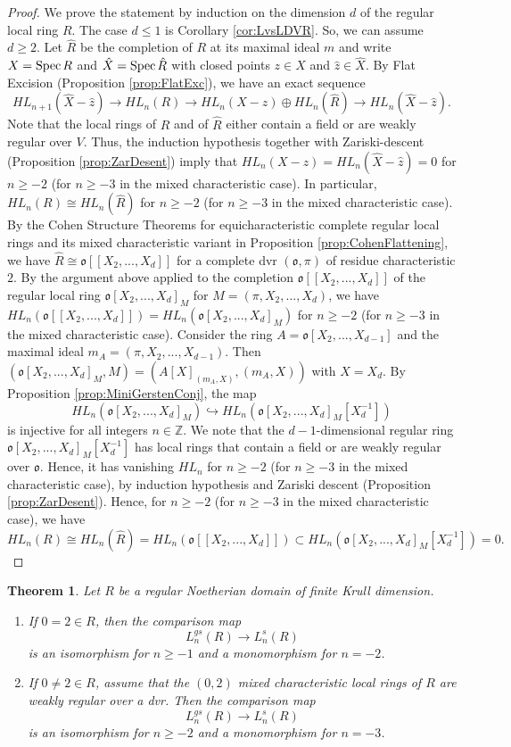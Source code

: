 \documentclass[10pt,twoside,a4paper,reqno]{amsart}
\newtheorem{theorem}{Theorem}[section]
\theoremstyle{definition}
\numberwithin{equation}{section}
\newcommand{\spec}{\mathrm{Spec\hskip .5mm }}
\newcommand{\Z}{\mathbb{Z}}
\renewcommand{\|}{\operatorname{|}}
\newcommand{\ooo}{\mathfrak{o}}
\begin{document}
\begin{proof}
We prove the statement by induction on the dimension $d$ of the regular local ring $R$.
The case $d\leq 1$ is Corollary \ref{cor:LvsLDVR}.
So, we can assume $d\geq 2$.
Let $\hat{R}$ be the completion of $R$ at its maximal ideal $m$ and write $X=\spec R$ and $\hat{X}=\spec \hat{R}$ with closed points $z\in X$ and $\hat{z} \in \hat{X}$.
By Flat Excision (Proposition \ref{prop:FlatExc}), we have an exact sequence
$$HL_{n+1}(\hat{X}-\hat{z})  \to HL_n(R) \to HL_n(X-z) \oplus HL_n(\hat{R}) \to HL_{n}(\hat{X}-\hat{z}).$$
Note that the local rings of $R$ and of $\hat{R}$ either contain a field or are weakly regular over $V$.
Thus, the induction hypothesis together with Zariski-descent (Proposition \ref{prop:ZarDesent}) imply that $HL_n(X-z) = HL_{n}(\hat{X}-\hat{z})=0$ for $n\geq -2$ (for $n\geq -3$ in the mixed characteristic case).
In particular, $HL_n(R) \cong HL_n(\hat{R})$ for $n \geq -2$ (for $n\geq -3$ in the mixed characteristic case).
By the Cohen Structure Theorems for equicharacteristic complete regular local rings and its mixed characteristic variant in Proposition \ref{prop:CohenFlattening}, we have $\hat{R}\cong \ooo[[X_2,...,X_d]]$ for a complete dvr $(\ooo,\pi)$ of residue characteristic $2$.
By the argument above applied to the completion $\ooo[[X_2,...,X_d]]$ of the regular local ring $\ooo[X_2,...,X_d]_M$ for $M=(\pi,X_2,...,X_d)$, 
we have $HL_n(\ooo[[X_2,...,X_d]]) = HL_n(\ooo[X_2,...,X_d]_M)$ for $n\geq -2$ (for $n\geq -3$ in the mixed characteristic case).
Consider the ring $A=\ooo[X_2,...,X_{d-1}]$ and the maximal ideal $m_A=(\pi,X_2,...,X_{d-1})$.
Then $(\ooo[X_2,...,X_d]_M,M) = (A[X]_{(m_A,X)},(m_A,X))$ with $X=X_d$.
By Proposition \ref{prop:MiniGerstenConj}, the map 
$$HL_n(\ooo[X_2,...,X_d]_M) \hookrightarrow HL_n(\ooo[X_2,...,X_d]_M[X_d^{-1}])$$ is injective for all integers $n\in \Z$.
We note that the $d-1$-dimensional regular ring $\ooo[X_2,...,X_d]_M[X_d^{-1}]$ has local rings that contain a field or are weakly regular over $\ooo$.
Hence, it has vanishing $HL_n$ for $n\geq -2$ (for $n\geq -3$ in the mixed characteristic case), by induction hypothesis and Zariski descent (Proposition \ref{prop:ZarDesent}).
Hence, for $n\geq -2$ (for $n\geq -3$ in the mixed characteristic case), we have
$$HL_n(R) \cong HL_n(\hat{R})= HL_n(\ooo[[X_2,...,X_d]]) \subset  HL_n(\ooo[X_2,...,X_d]_M[X_d^{-1}])=0.$$
\end{proof}



\begin{theorem}
\label{thm:MainLText}
Let $R$ be a regular Noetherian domain of finite Krull dimension.
\begin{enumerate}
\item
If $0=2\in R$, then the comparison map
$$L_n^{gs}(R) \to L_n^s(R)$$
is an isomorphism for $n \geq -1$ and a monomorphism for $n=-2$.
\item
If $0\neq 2\in R$, assume that the $(0,2)$ mixed characteristic local rings of $R$ are weakly regular over a dvr. 
Then the comparison map
$$L_n^{gs}(R) \to L_n^s(R)$$
is an isomorphism for $n \geq -2$ and a monomorphism for $n=-3$.
\end{enumerate}
\end{theorem}
\end{document}
